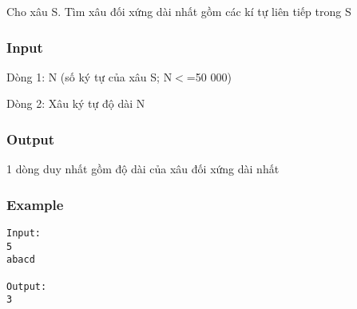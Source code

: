 



   Cho xâu S. Tìm xâu đối xứng dài nhất gồm các kí tự liên tiếp trong S  

\subsubsection{   Input  }

   Dòng 1: N (số ký tự của xâu S; N$<$=50 000)  

   Dòng 2: Xâu ký tự độ dài N  

\subsubsection{   Output  }

   1 dòng duy nhất gồm độ dài của xâu đối xứng dài nhất  

\subsubsection{   Example  }
\begin{verbatim}
Input:
5
abacd

Output:
3

\end{verbatim}